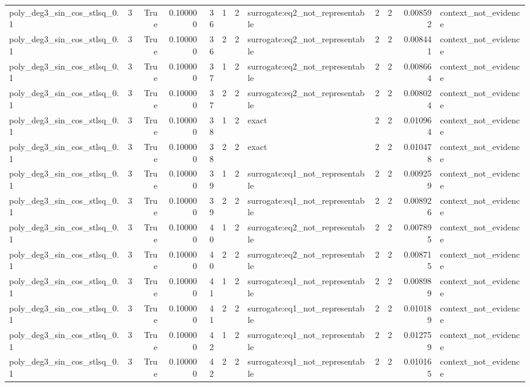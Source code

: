 \begin{tabular}{lrrrrrrlrrrl}
poly\_deg3\_sin\_cos\_stlsq\_0.1 & 3 & True & 0.100000 & 36 & 1 & 2 & surrogate:eq2\_not\_representable & 2 & 2 & 0.008592 & context\_not\_evidence \\
poly\_deg3\_sin\_cos\_stlsq\_0.1 & 3 & True & 0.100000 & 36 & 2 & 2 & surrogate:eq2\_not\_representable & 2 & 2 & 0.008441 & context\_not\_evidence \\
poly\_deg3\_sin\_cos\_stlsq\_0.1 & 3 & True & 0.100000 & 37 & 1 & 2 & surrogate:eq2\_not\_representable & 2 & 2 & 0.008664 & context\_not\_evidence \\
poly\_deg3\_sin\_cos\_stlsq\_0.1 & 3 & True & 0.100000 & 37 & 2 & 2 & surrogate:eq2\_not\_representable & 2 & 2 & 0.008024 & context\_not\_evidence \\
poly\_deg3\_sin\_cos\_stlsq\_0.1 & 3 & True & 0.100000 & 38 & 1 & 2 & exact & 2 & 2 & 0.010964 & context\_not\_evidence \\
poly\_deg3\_sin\_cos\_stlsq\_0.1 & 3 & True & 0.100000 & 38 & 2 & 2 & exact & 2 & 2 & 0.010478 & context\_not\_evidence \\
poly\_deg3\_sin\_cos\_stlsq\_0.1 & 3 & True & 0.100000 & 39 & 1 & 2 & surrogate:eq1\_not\_representable & 2 & 2 & 0.009259 & context\_not\_evidence \\
poly\_deg3\_sin\_cos\_stlsq\_0.1 & 3 & True & 0.100000 & 39 & 2 & 2 & surrogate:eq1\_not\_representable & 2 & 2 & 0.008926 & context\_not\_evidence \\
poly\_deg3\_sin\_cos\_stlsq\_0.1 & 3 & True & 0.100000 & 40 & 1 & 2 & surrogate:eq2\_not\_representable & 2 & 2 & 0.007895 & context\_not\_evidence \\
poly\_deg3\_sin\_cos\_stlsq\_0.1 & 3 & True & 0.100000 & 40 & 2 & 2 & surrogate:eq2\_not\_representable & 2 & 2 & 0.008715 & context\_not\_evidence \\
poly\_deg3\_sin\_cos\_stlsq\_0.1 & 3 & True & 0.100000 & 41 & 1 & 2 & surrogate:eq1\_not\_representable & 2 & 2 & 0.008989 & context\_not\_evidence \\
poly\_deg3\_sin\_cos\_stlsq\_0.1 & 3 & True & 0.100000 & 41 & 2 & 2 & surrogate:eq1\_not\_representable & 2 & 2 & 0.010189 & context\_not\_evidence \\
poly\_deg3\_sin\_cos\_stlsq\_0.1 & 3 & True & 0.100000 & 42 & 1 & 2 & surrogate:eq1\_not\_representable & 2 & 2 & 0.012759 & context\_not\_evidence \\
poly\_deg3\_sin\_cos\_stlsq\_0.1 & 3 & True & 0.100000 & 42 & 2 & 2 & surrogate:eq1\_not\_representable & 2 & 2 & 0.010165 & context\_not\_evidence \\

\end{tabular}

